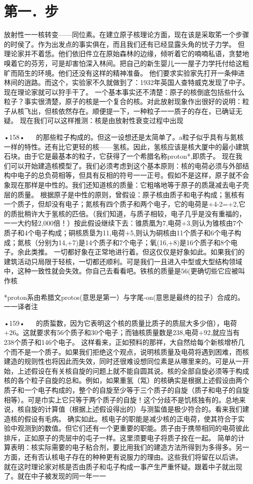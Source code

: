 \section{第一．步}

放射性一一核转变——同位素。在建立原子核理论方面，现在该是采取笫一个步骤的时侯了。作为出发点的事实俱在，而且我们还有已经显露头角的忧子力学。
但理论家并不着恁。他们依旧件立在原始森林的边缘，倾听着它的喃喃私语，贪婪地嗅着它的芬芳，可是却害怕深入林间。把自己的新生婴儿一一屋子力学托付给这粗旷而陌生的环境。他们还没有这样的精神准备。
他们要求实验家先打开一条伸进林间的逍路。而这个，实验家不久就做到了：1932年英国人查特威克发现了中子。现在理论家就可以狩手干了。
一个基本事实还不清楚：原子的核倒底包括些什么粒子？事实很清楚，原子的核是一个复合的核。对此放射现象作出很好的说明：粒子从核飞出，但核依然存在。顺便提一下，一种粒子一一质子的存在，已确证无疑。
现在我们可以这样推测：核是由放射性衰变过程中出现

•158•
  
的那些粒子构成的。但这一设想还是太简单了。a粒子似乎具有与氮核一样的特性。还有比它更轻的核——氢核。因此，氢核应该是核大厦中的最小建筑石块。由于它是最基本的粒子，它获得了一个希腊名称proton*,即质子。
现在我们可以开始建造核模型了。我们必须考虑到这个基本原则：核的电荷必须与外部结构中电子的总负荷相等，但具有反相的符号一一正号。假如不是这样，原子就不会象现在那样是中性的。我们还知道核的质量：它粗咯地等于原子的质晟减去电子壳层的质量。
根据原子是中性的原则，曾假设：原子核由质子和电子构成；氢核有一个质子，但却没有电子；氮核有四个质子和两个电子，它的电荷是+4-2=+2,它的质批稍许大于氢核的匹倍。（我们知道，与质子相较，电子几乎是没有重福的，一一大约轻2,000倍！）按此假设继续下去：锥质凰为7,电荷+3,则认为锥核由7个质子和4个电子构成；硐核质垦为11,电荷+5,则认为硐核由11个质子和6个电子构成；氮核（分别为14,+7)是14个质子和7个电子；氧(16,+8)是16个质子和8个电子。余此类推。
一切都好象在正常地进行着。但这仅仅是好象如此。如果我们的建筑活动只局限于轻核，一切都还顺利。可是我们一且进入中型或大型结构领域中，这种一致性就会失效。你自己去看看吧。铁核的质量是56(更确切些它应被叫作核

*proton系由希腊文protos(意思是第一）与字尾-on(意思是最终的拉子）合成的。一一译者注

•159•
  
的质蜇数，因为它表明这个核的质量比质子的质屈大多少倍），电荷+26。这就要求有56个质子和30个电子；而铀核质量数是238,电荷+92,就应当有238个质子和146个电子。
这样看来，正如预料的那祥，大自然给每个新核增桥几个而不是一个质子。如果我们拒绝这个观点，说明核质量及电荷将遇到困难，而核建造的规则性也将因此而失效，同时还很难设想同位素是从哪里来的。可是从一开始，上述假设在有关核自旋的问题上就不能自圆其说。核的全部自旋必须等于构成核的各个粒子自旋的总和。例如，如果重氢（氝）的核确实是根据上述假设由两个质子和一个电子构成的，整个的自旋至少等于三个质子的自旋（质子和电子的自旋相等）。可是巾实上它只等于两个质子的自旋！这个分歧不是饥核独有的。总地来说，核自旋的计算值（根据上述假设得出的）与测蜇值是极少符合的。看来我们建造核的假设有毛病。
确实如此。核电子的职能是减少核的正电荷，使其符合于实验中观测到的数值。但它们还有一个更重要的职能。质子由于携带相同的电荷彼此排斥，正如原子的壳层中的屯子一样。这里须要电子将质子拴在一起。
简单的计算表明：核实际需要的电子粘合剂，要比用我们的建造方法所得到为多得多。另一方面，还有否认核电子存在的种种更有说服力的理由。这些我们将留在以后讲。
就在这时理论家对核是否由质子和屯子构成一事产生严重怀疑。跟着中子就出现了。就在中子被发现的同一年一一

